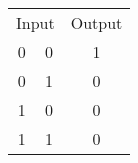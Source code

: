 \documentclass{standalone}
\begin{document}
\begin{tabular}{ccc}
	\toprule
		\multicolumn{2}{c}{Input} & Output \\
	\cmidrule(r){1-2} \cmidrule(l){3-3}
		0 & 0 & 1 \\
		0 & 1 & 0 \\
		1 & 0 & 0 \\
		1 & 1 & 0 \\
	\bottomrule
\end{tabular}
\end{document}
